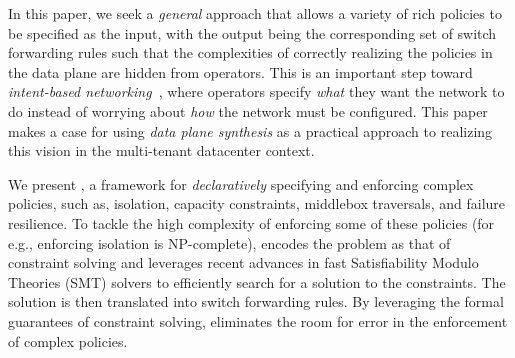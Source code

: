 

In this paper, we seek a {\em general} approach that allows a variety
of rich policies to be specified as the input, with the output being
the corresponding set of switch forwarding rules such that the
complexities of correctly realizing the policies in the data plane are
hidden from operators. This is an important step toward {\em
  intent-based networking}~\cite{intent}, where operators specify {\em
  what} they want the network to do instead of worrying about {\em
  how} the network must be configured.
This paper makes a case for using \emph{data plane synthesis} as a
practical approach to realizing this vision in the multi-tenant
datacenter context.

We present \Name, a framework for {\em declaratively} specifying and
enforcing complex policies, such as, isolation, capacity constraints,
middlebox traversals, and failure resilience. To tackle the high
complexity of enforcing some of these policies (for e.g., enforcing
isolation is NP-complete), \Name encodes the problem as that of
constraint solving and leverages recent advances in fast
Satisfiability Modulo Theories (SMT) solvers to efficiently search for
a solution to the constraints.  The solution is then translated into
switch forwarding rules.
By leveraging the formal guarantees of constraint solving, \Name
eliminates the room for error in the enforcement of complex
policies.

